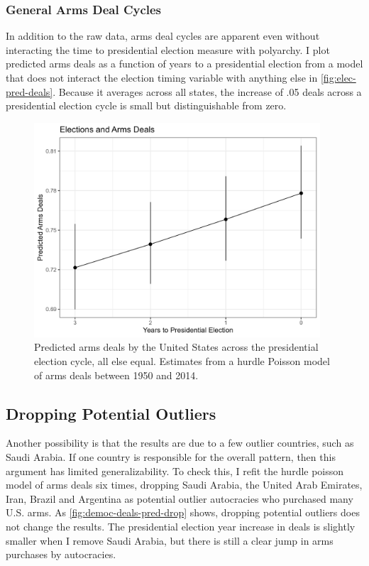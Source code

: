 \documentclass[12pt]{article}
\begin{document}
\subsubsection{General Arms Deal Cycles}

In addition to the raw data, arms deal cycles are apparent even without interacting the time to presidential election measure with polyarchy.
I plot predicted arms deals as a function of years to a presidential election from a model that does not interact the election timing variable with anything else in \autoref{fig:elec-pred-deals}. 
Because it averages across all states, the increase of .05 deals across a presidential election cycle is small but distinguishable from zero. 


\begin{figure}[htpb]
	\centering
		\includegraphics[width=0.95\textwidth]{elec-pred-deals.png}
	\caption{Predicted arms deals by the United States across the presidential election cycle, all else equal. Estimates from a hurdle Poisson model of arms deals between 1950 and 2014. }
	\label{fig:elec-pred-deals}
\end{figure}



\subsection{Dropping Potential Outliers}

Another possibility is that the results are due to a few outlier countries, such as Saudi Arabia. 
If one country is responsible for the overall pattern, then this argument has limited generalizability. 
To check this, I refit the hurdle poisson model of arms deals six times, dropping Saudi Arabia, the United Arab Emirates, Iran, Brazil and Argentina as potential outlier autocracies who purchased many U.S. arms. 
As \autoref{fig:democ-deals-pred-drop} shows, dropping potential outliers does not change the results. 
The presidential election year increase in deals is slightly smaller when I remove Saudi Arabia, but there is still a clear jump in arms purchases by autocracies.  
\end{document}
